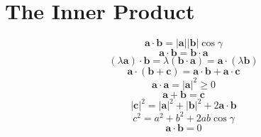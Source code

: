 \documentclass[11pt, a4paper, fleqn]{report}
\numberwithin{equation}{section}
\def\*#1{\mathbf{#1}}
\begin{document}
\section{The Inner Product}
\begin{equation}
    \*a\cdot\*b=|\*a||\*b|\cos\gamma
\end{equation}
\begin{equation}
    \*a \cdot \*b = \*b \cdot \*a
\end{equation}
\begin{equation}
    (\lambda\*a)\cdot\*b = \lambda(\*b \cdot\*a)=\*a \cdot(\lambda\*b)
\end{equation}
\begin{equation}
    \*a \cdot(\*b +\*c)=\*a \cdot\*b +\*a \cdot \*c
\end{equation}
\begin{equation}
    \*a \cdot \*a = |\*a|^2\geq 0
\end{equation}
\begin{equation}
    \*a + \*b=\*c
\end{equation}
\begin{equation}
    |\*c|^2=|\*a|^2+|\*b|^2+2\*a \cdot \*b
\end{equation}
\begin{equation}
    c^2=a^2+b^2+2ab\cos\gamma
\end{equation}
\begin{equation}
    \*a \cdot \*b=0
\end{equation}
\end{document}
